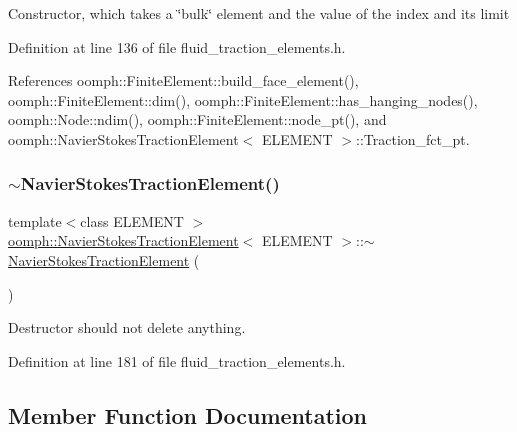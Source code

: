 Constructor, which takes a \char`\"{}bulk\char`\"{} element and the value of the index and its limit 

Definition at line 136 of file fluid\+\_\+traction\+\_\+elements.\+h.



References oomph\+::\+Finite\+Element\+::build\+\_\+face\+\_\+element(), oomph\+::\+Finite\+Element\+::dim(), oomph\+::\+Finite\+Element\+::has\+\_\+hanging\+\_\+nodes(), oomph\+::\+Node\+::ndim(), oomph\+::\+Finite\+Element\+::node\+\_\+pt(), and oomph\+::\+Navier\+Stokes\+Traction\+Element$<$ E\+L\+E\+M\+E\+N\+T $>$\+::\+Traction\+\_\+fct\+\_\+pt.

\mbox{\label{classoomph_1_1NavierStokesTractionElement_ab45fafc53fd532054e11cc2f2e68659c}} 
\subsubsection{\texorpdfstring{$\sim$\+Navier\+Stokes\+Traction\+Element()}{~NavierStokesTractionElement()}}
{\footnotesize\ttfamily template$<$class E\+L\+E\+M\+E\+NT $>$ \\
\hyperlink{classoomph_1_1NavierStokesTractionElement}{oomph\+::\+Navier\+Stokes\+Traction\+Element}$<$ E\+L\+E\+M\+E\+NT $>$\+::$\sim$\hyperlink{classoomph_1_1NavierStokesTractionElement}{Navier\+Stokes\+Traction\+Element} (\begin{DoxyParamCaption}{ }\end{DoxyParamCaption})\hspace{0.3cm}{\ttfamily [inline]}}



Destructor should not delete anything. 



Definition at line 181 of file fluid\+\_\+traction\+\_\+elements.\+h.



\subsection{Member Function Documentation}
\mbox{\label{classoomph_1_1NavierStokesTractionElement_a87adb28c2292e58aab9ff1d1ebbd3fc7}} 
